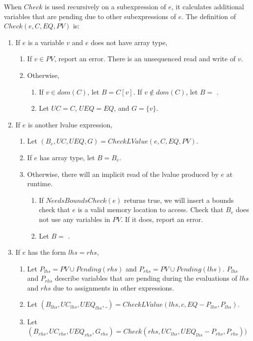 When $Check$ is used recursively on a subexpression of $e$, it calculates 
additional variables that are pending due to other subexpressions of $e$.
The definition of $Check(e, C, EQ, PV)$ is:
\begin{enumerate}
\item If $e$ is a variable $v$ and $e$ does not have array type,
\begin{enumerate}
\item If $v \in PV$, report an error.  There is an unsequenced read and write of $v$.
\item Otherwise,
\begin{enumerate} 
\item If $v \in dom(C)$, let $B = C[v]$.  If $v \notin dom(C)$, let $B =$ \boundsunknown.
\item Let $UC = C$, $UEQ = EQ$, and $G = \{ v \}$.
\end{enumerate}
\end{enumerate}
\item If $e$ is another lvalue expression, 
\begin{enumerate}
\item Let $(B_e, UC, UEQ, G) = CheckLValue(e, C, EQ,PV)$.
\item If $e$ has array type, let $B = B_e$.
\item Otherwise, there will an implicit read of the lvalue produced by $e$ at runtime.
\begin{enumerate}
\item If $NeedsBoundsCheck(e)$ returns true, we will insert a bounds check that $e$
is a valid memory location to access.  Check that $B_e$ does not use any variables in 
$PV$.  If it does, report an error.
\item Let $B = $ \boundsunknown.
\end{enumerate}
\end{enumerate}
\item If $e$ has the form $lhs = rhs$,
\label{list:check-assignment}
\begin{enumerate}
\item Let $P_{lhs} = PV \cup Pending(rhs)$ and $P_{rhs} = PV \cup Pending(lhs).$   $P_{lhs}$
        and $P_{rhs}$  describe variables that are pending during the evaluations of $lhs$ and $rhs$ due
        to assignments in other expressions.
\item Let $(B_{lhs}, {UC}_{lhs}, {UEQ}_{lhs}, \_) = CheckLValue(lhs, c, EQ - P_{lhs}, P_{lhs})$.  
\item Let $(B_{rhs}, {UC}_{rhs}, {UEQ}_{rhs}, G_{rhs}) = Check(rhs, {UC}_{lhs}, {UEQ}_{lhs} - P_{rhs},P_{rhs}))$ 

\end{enumerate}
\end{enumerate}
